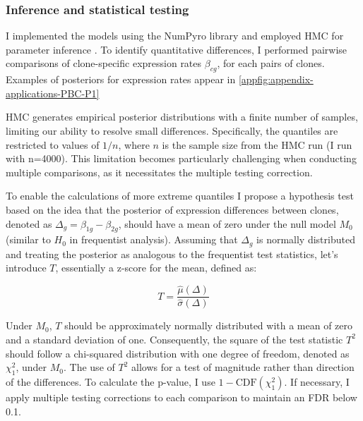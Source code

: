 \subsubsection*{Inference and statistical testing}

I implemented the models using the \ac{NumPyro} library and employed \acf{HMC} for parameter inference . To identify quantitative differences, I performed pairwise comparisons of clone-specific expression rates $\beta_{cg}$, for each pairs of clones. Examples of posteriors for expression rates appear in \cref{appfig:appendix-applications-PBC-P1}

\ac{HMC} generates empirical posterior distributions with a finite number of samples, limiting our ability to resolve small differences. Specifically, the quantiles are restricted to values of $1/n$, where $n$ is the sample size from the \ac{HMC} run (I run with n=4000). This limitation becomes particularly challenging when conducting multiple comparisons, as it necessitates the multiple testing correction. 

To enable the calculations of more extreme quantiles I propose a hypothesis test based on the idea that the posterior of expression differences between clones, denoted as $\Delta_g = \beta_{1g} - \beta_{2g}$, should have a mean of zero under the null model $M_0$ (similar to $H_0$ in frequentist analysis). Assuming that $\Delta_g$ is normally distributed and treating the posterior as analogous to the frequentist test statistics, let's introduce $T$, essentially a z-score for the mean, defined as:

\begin{equation}
    T = \frac{\hat{\mu}(\Delta)}{\hat{\sigma}(\Delta)}
\end{equation}


Under $M_0$, $T$ should be approximately normally distributed with a mean of zero and a standard deviation of one. Consequently, the square of the test statistic $T^2$ should follow a chi-squared distribution with one degree of freedom, denoted as $\chi^2_1$, under $M_0$. The use of $T^2$ allows for a test of magnitude rather than direction of the differences. To calculate the p-value, I use $1 - \text{CDF}(\chi^2_1)$. If necessary, I apply multiple testing corrections to each comparison to maintain an \acs{FDR} below 0.1.

